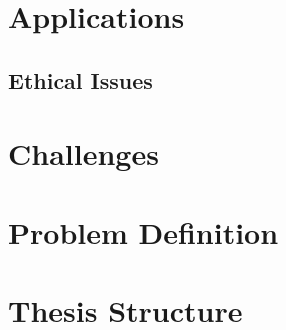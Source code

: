 \section{Applications}

\subsection{Ethical Issues}

\section{Challenges}

\section{Problem Definition}

\section{Thesis Structure}